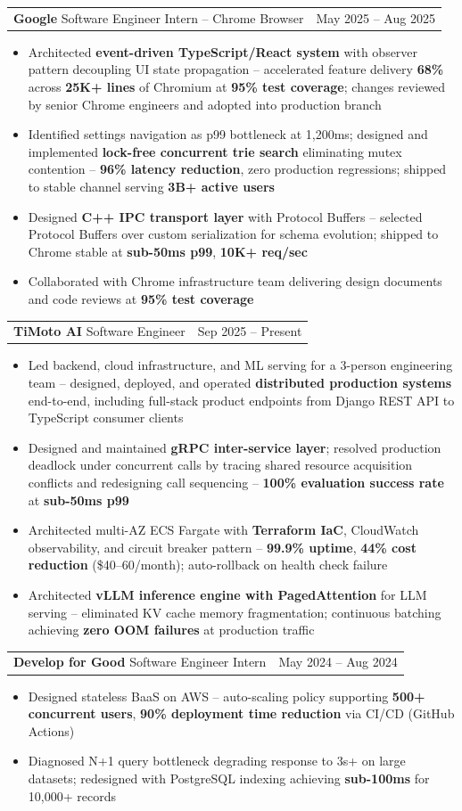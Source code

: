 \documentclass[letterpaper,11pt]{article}
\makeatletter
\newcommand{\resumeItem}[1]{
  \item\small{{#1 \vspace{-2pt}}}
}
\newcommand{\resumeSubheadingShortSplit}[3]{%
  \vspace{-2pt}\item
    \begin{tabular*}{0.98\textwidth}[t]{l@{\extracolsep{\fill}}r}
      {\normalsize\textbf{#1}} \textbar{} {\normalsize #2} & {\normalsize #3} \\
    \end{tabular*}\vspace{-7pt}
}
\newcommand{\resumeItemListStart}{\begin{itemize}}
\newcommand{\resumeItemListEnd}{\end{itemize}\vspace{-5pt}}
\makeatother
\begin{document}
    \resumeSubheadingShortSplit
      {Google}{Software Engineer Intern -- Chrome Browser}{May 2025 -- Aug 2025}
      \resumeItemListStart
        \resumeItem{Architected \textbf{event-driven TypeScript/React system} with observer pattern decoupling UI state propagation -- accelerated feature delivery \textbf{68\%} across \textbf{25K+ lines} of Chromium at \textbf{95\% test coverage}; changes reviewed by senior Chrome engineers and adopted into production branch}
        \resumeItem{Identified settings navigation as p99 bottleneck at 1,200ms; designed and implemented \textbf{lock-free concurrent trie search} eliminating mutex contention -- \textbf{96\% latency reduction}, zero production regressions; shipped to stable channel serving \textbf{3B+ active users}}
        \resumeItem{Designed \textbf{C++ IPC transport layer} with Protocol Buffers -- selected Protocol Buffers over custom serialization for schema evolution; shipped to Chrome stable at \textbf{sub-50ms p99}, \textbf{10K+ req/sec}}
        \resumeItem{Collaborated with Chrome infrastructure team delivering design documents and code reviews at \textbf{95\% test coverage}}
      \resumeItemListEnd

    \resumeSubheadingShortSplit
      {TiMoto AI}{Software Engineer}{Sep 2025 -- Present}
        \resumeItemListStart
          \resumeItem{Led backend, cloud infrastructure, and ML serving for a 3-person engineering team -- designed, deployed, and operated \textbf{distributed production systems} end-to-end, including full-stack product endpoints from Django REST API to TypeScript consumer clients}
          \resumeItem{Designed and maintained \textbf{gRPC inter-service layer}; resolved production deadlock under concurrent calls by tracing shared resource acquisition conflicts and redesigning call sequencing -- \textbf{100\% evaluation success rate} at \textbf{sub-50ms p99}}
          \resumeItem{Architected multi-AZ ECS Fargate with \textbf{Terraform IaC}, CloudWatch observability, and circuit breaker pattern -- \textbf{99.9\% uptime}, \textbf{44\% cost reduction} (\$40--60/month); auto-rollback on health check failure}
          \resumeItem{Architected \textbf{vLLM inference engine with PagedAttention} for LLM serving -- eliminated KV cache memory fragmentation; continuous batching achieving \textbf{zero OOM failures} at production traffic}
      \resumeItemListEnd

    \resumeSubheadingShortSplit
      {Develop for Good}{Software Engineer Intern}{May 2024 -- Aug 2024}
      \resumeItemListStart
        \resumeItem{Designed stateless BaaS on AWS -- auto-scaling policy supporting \textbf{500+ concurrent users}, \textbf{90\% deployment time reduction} via CI/CD (GitHub Actions)}
        \resumeItem{Diagnosed N+1 query bottleneck degrading response to 3s+ on large datasets; redesigned with PostgreSQL indexing achieving \textbf{sub-100ms} for 10,000+ records}
      \resumeItemListEnd
\end{document}
